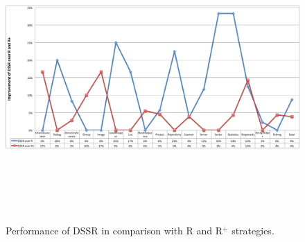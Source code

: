 \bigskip
\begin{figure}[h]
	\centering
	\centerline{\includegraphics[width=16cm, height=11cm]{chapter4/DssrImprove.png}}
	\bigskip
	\caption{Performance of DSSR in comparison with R and R$^+$ strategies.}
	\label{fig:LineChart}
\end{figure}
\bigskip





